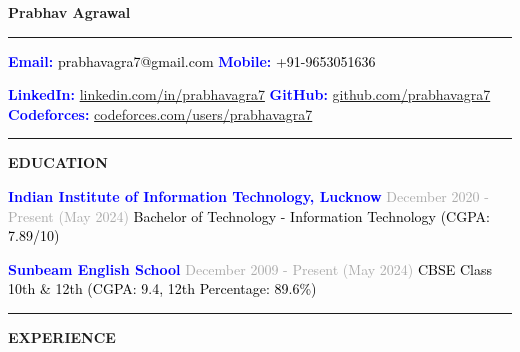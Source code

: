 \documentclass[letterpaper, 10pt, oneside]{article}
\begin{document}
\thispagestyle{empty}

\noindent
{\Large\bfseries Prabhav Agrawal}

\vspace{0.2cm}
\noindent
\textcolor{darkgray}{\rule{\textwidth}{0.4pt}}

\vspace{0.2cm}
\noindent
\textcolor{blue}{\textbf{Email:}} \textcolor{black}{prabhavagra7@gmail.com}
\hspace{1.8cm} \textcolor{blue}{\textbf{Mobile:}} \textcolor{black}{+91-9653051636}

\vspace{0.2cm}
\noindent
\textcolor{blue}{\textbf{LinkedIn:}} \textcolor{black}{\href{https://www.linkedin.com/in/prabhavagra7/}{linkedin.com/in/prabhavagra7}}
\hspace{0.8cm} \textcolor{blue}{\textbf{GitHub:}} \textcolor{black}{\href{https://github.com/prabhavagra7}{github.com/prabhavagra7}}
\hspace{0.8cm} \textcolor{blue}{\textbf{Codeforces:}} \textcolor{black}{\href{https://codeforces.com/profile/prabhavagra7}{codeforces.com/users/prabhavagra7}}

\vspace{0.2cm}
\noindent
\textcolor{darkgray}{\rule{\textwidth}{0.4pt}}

\vspace{0.5cm}
\noindent
{\Large\bfseries EDUCATION}

\vspace{0.2cm}
\noindent
\textcolor{blue}{\textbf{Indian Institute of Information Technology, Lucknow}} \hspace{3.8cm} \textcolor{darkgray}{December 2020 - Present (May 2024)}
\textcolor{black}{Bachelor of Technology - Information Technology (CGPA: 7.89/10)}

\vspace{0.2cm}
\noindent
\textcolor{blue}{\textbf{Sunbeam English School}} \hspace{7.4cm} \textcolor{darkgray}{December 2009 - Present (May 2024)}
\textcolor{black}{CBSE Class 10th \& 12th (CGPA: 9.4, 12th Percentage: 89.6\%)}

\vspace{0.2cm}
\noindent
\textcolor{darkgray}{\rule{\textwidth}{0.4pt}}

\vspace{0.5cm}
\noindent
{\Large\bfseries EXPERIENCE}
\end{document}
